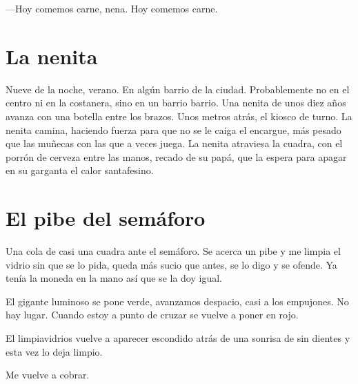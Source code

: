 \documentclass[11pt,twoside,openright,a6paper]{book}
\begin{document}
---Hoy comemos carne, nena. Hoy comemos carne.

\chapter*{La nenita}

Nueve de la noche, verano. En algún barrio de la ciudad.
Probablemente no en el centro ni en la costanera, sino en un barrio barrio. 
Una nenita de unos diez años avanza con una botella entre los brazos. 
Unos metros atrás, el kiosco de turno. 
La nenita camina, haciendo fuerza para que no se le caiga el encargue, más pesado que las muñecas con las que a veces juega. 
La nenita atraviesa la cuadra, con el porrón de cerveza entre las manos, recado de su papá, que la espera para apagar en su garganta el calor santafesino.

\chapter*{El pibe del semáforo}

Una cola de casi una cuadra ante el semáforo. Se acerca un pibe y me limpia el vidrio sin que se lo pida, queda más sucio que antes, se lo digo y se ofende. Ya tenía la moneda en la mano así que se la doy igual.

El gigante luminoso se pone verde, avanzamos despacio, casi a los empujones. No hay lugar. Cuando estoy a punto de cruzar se vuelve a poner en rojo.

El limpiavidrios vuelve a aparecer escondido atrás de una sonrisa de sin dientes y esta vez lo deja limpio.

Me vuelve a cobrar.
\end{document}
